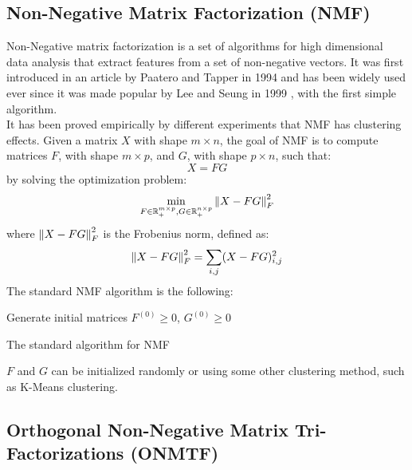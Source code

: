 \subsection{Non-Negative Matrix Factorization (NMF)}

Non-Negative matrix factorization is a set of algorithms for high dimensional data analysis that extract features from a set of non-negative vectors. It was first introduced in an article by Paatero and Tapper in 1994 \cite{10.1002/env.3170050203} and has been widely used ever since it was made popular by Lee and Seung in 1999 \cite{10.1038/44565}, with the first simple algorithm.\\
It has been proved empirically by different experiments \cite{10.5555/1005332.1044709, 10.1109/CVPR.2001.990477} that NMF has clustering effects.
Given a matrix $X$ with shape $m \times n$, the goal of NMF is to compute matrices $F$, with shape $m \times p$, and $G$, with shape $p \times n$, such that:
\begin{equation*}
X = FG
\end{equation*}
by solving the optimization problem:
\begin{equation*}
\min_{F \in \mathbb{R}^{m \times p}_+, G \in \mathbb{R}^{n \times p}_+} \left\lVert X - FG\right\rVert_F^2
\end{equation*}
where $\left\lVert X - FG\right\rVert_F^2$ is the Frobenius norm, defined as:
\begin{equation*}
\left\lVert X - FG\right\rVert_F^2 = \sum_{i,j} (X - FG)_{i,j}^2
\end{equation*}
The standard NMF algorithm is the following:
\vskip 0.7cm
\begin{algorithm}[H]
Generate initial matrices $F^{(0)} \geq 0$, $G^{(0)} \geq 0$\;
\caption{The standard algorithm for NMF}
\end{algorithm}
\vskip 0.7cm
$F$ and $G$ can be initialized randomly or using some other clustering method, such as K-Means clustering.


\subsection{Orthogonal Non-Negative Matrix Tri-Factorizations (ONMTF)}

